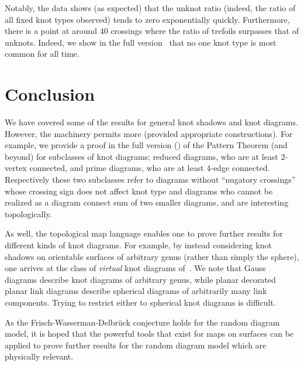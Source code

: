 \documentclass[submission%
]{dmtcs}
\begin{document}
Notably, the data shows (as expected) that the unknot ratio (indeed,
the ratio of all fixed knot types observed) tends to zero
exponentially quickly. Furthermore, there is a point at around 40
crossings where the ratio of trefoils surpasses that of
unknots. Indeed, we show in the full version~\cite{chapman2015} that
no one knot type is most common for all time.

\section{Conclusion}
\label{sec:conclusion}

We have covered some of the results for general knot shadows and knot
diagrams. However, the machinery permits more (provided appropriate
constructions). For example, we provide a proof in the full
version (\cite{chapman2015}) of the Pattern Theorem (and beyond) for
subclasses of knot diagrams; reduced diagrams, who are at least
$2$-vertex connected, and prime diagrams, who are at least $4$-edge
connected. Respectively these two subclasses refer to diagrams without
``nugatory crossings'' whose crossing sign does not affect knot type
and diagrams who cannot be realized as a diagram connect sum of two
smaller diagrams, and are interesting topologically.

As well, the topological map language enables one to prove further
results for different kinds of knot diagrams. For example, by instead
considering knot shadows on orientable surfaces of arbitrary genus
(rather than simply the sphere), one arrives at the class of
\emph{virtual} knot diagrams of~\cite{Kauffman1999663}. We note that
Gauss diagrams describe knot diagrams of arbitrary genus, while planar
decorated planar link diagrams describe spherical diagrams of
arbitrarily many link components. Trying to restrict either to
spherical knot diagrams is difficult.

As the Frisch-Wasserman-Delbr\"uck conjecture holds for the random
diagram model, it is hoped that the powerful tools that exist for maps
on surfaces can be applied to prove further results for the random
diagram model which are physically relevant.

\acknowledgements
\label{sec:acknowledgements}
\end{document}
